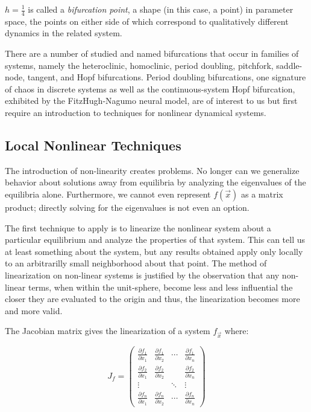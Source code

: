\documentclass{elsart1p}
\begin{document}
$h=\frac{1}{4}$ is called a \textit{bifurcation point}, a shape (in this case, a point) in parameter space, the points on either side of which correspond to qualitatively different dynamics in the related system.

There are a number of studied and named bifurcations that occur in families of systems, namely the heteroclinic, homoclinic, period doubling, pitchfork, saddle-node, tangent, and Hopf bifurcations.  Period doubling bifurcations, one signature of chaos in discrete systems as well as the continuous-system Hopf bifurcation, exhibited by the FitzHugh-Nagumo neural model, are of interest to us but 
first require an introduction to techniques for nonlinear dynamical systems.


\subsection{ Local Nonlinear Techniques }
The introduction of non-linearity creates problems.  No longer can we
generalize behavior about solutions away from equilibria by analyzing the
eigenvalues of the equilibria alone.  Furthermore, we cannot even
represent $f(\vec{x})$ as a matrix product; directly solving for
the eigenvalues is not even an option.

The first technique to apply is to
linearize the nonlinear system about a particular equilibrium and analyze
the properties of that system.  This can tell us at least something about
the system, but any results obtained apply only locally to an 
arbitrarilly small neighborhood about that point.
The method of linearization on non-linear systems is justified by 
the observation
that any non-linear terms, when within the unit-sphere, become less and
less influential the closer they are evaluated to the origin and thus, the
linearization becomes more and more valid.

The Jacobian matrix gives the linearization of a system $f_{\vec{x}}$ where:

\[ J_{f} = \left( \begin{array}{cccc}

\frac{\partial f_{1}}{\partial x_{1}} & 
\frac{\partial f_{1}}{\partial x_{2}} & 
\cdots &
\frac{\partial f_{1}}{\partial x_{n}} \\

\frac{\partial f_{2}}{\partial x_{1}} & 
\frac{\partial f_{2}}{\partial x_{2}} & 
 &
\frac{\partial f_{2}}{\partial x_{n}} \\

\vdots & & \ddots & \vdots \\


\frac{\partial f_{n}}{\partial x_{1}} & 
\frac{\partial f_{n}}{\partial x_{2}} & 
\cdots &
\frac{\partial f_{n}}{\partial x_{n}} \end{array} \right)\] 
\end{document}
